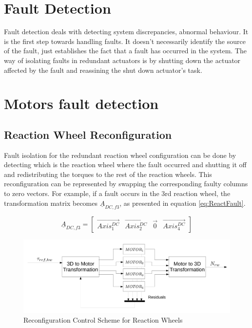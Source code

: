 \section{Fault Detection}

Fault detection deals with detecting system discrepancies, abnormal behaviour. It is the first step towards handling faults. It doesn't necessarily identify the source of the fault, just establishes the fact that a fault has occurred in the system. The way of isolating faults in redundant actuators is by shutting down the actuator affected by the fault and reassining the shut down actuator's task.


\section{Motors fault detection}





\subsection{Reaction Wheel Reconfiguration}
Fault isolation for the redundant reaction wheel configuration can be done by detecting which is the reaction wheel where the fault occurred and shutting it off and redistributing the torques to the rest of the reaction wheels. This reconfiguration can be represented by swapping the corresponding faulty columns to zero vectors. For example, if a fault occurs in the 3rd reaction wheel, the transformation matrix becomes $\underline{A}_{DC,f3}$, as presented in equation \ref{eq:ReactFault}.

\begin{equation}
\label{eq:ReactFault}
\underline{A}_{DC,f3} = \begin{bmatrix}
\vec{Axis^{DC}_{1}}       & \vec{Axis^{DC}_{2}}   & \vec{0}   & \vec{Axis^{DC}_{4}} 
\end{bmatrix} 
\end{equation}

\begin{figure}[H]
	\centering 
	\includegraphics[width=170mm]{figures/reconfigure.pdf}	
	\caption{Reconfiguration Control Scheme for Reaction Wheels}
	\label{fig:reconfig}
\end{figure}

